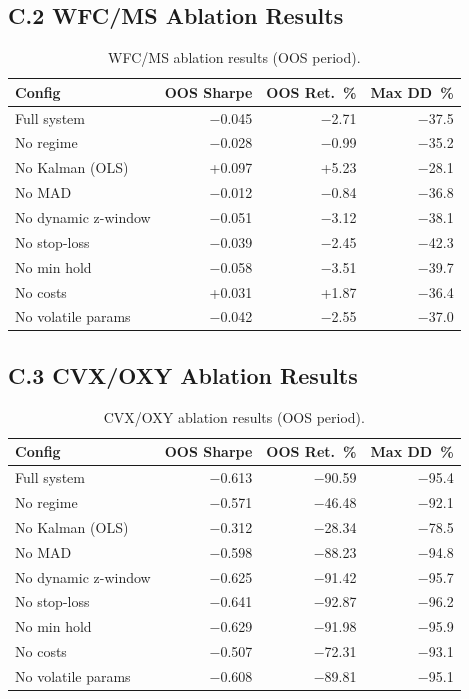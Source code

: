 \documentclass[conference]{IEEEtran}
\begin{document}
\subsection{C.2 WFC/MS Ablation Results}

\begin{table}[h]
\centering
\caption{WFC/MS ablation results (OOS period).}
\label{tab:supp_wfc_abl}
\small
\begin{tabular}{lrrr}
\toprule
Config & OOS Sharpe & OOS Ret.~\% & Max DD~\% \\
\midrule
Full system & $-$0.045 & $-$2.71 & $-$37.5 \\
No regime & $-$0.028 & $-$0.99 & $-$35.2 \\
No Kalman (OLS) & +0.097 & +5.23 & $-$28.1 \\
No MAD & $-$0.012 & $-$0.84 & $-$36.8 \\
No dynamic z-window & $-$0.051 & $-$3.12 & $-$38.1 \\
No stop-loss & $-$0.039 & $-$2.45 & $-$42.3 \\
No min hold & $-$0.058 & $-$3.51 & $-$39.7 \\
No costs & +0.031 & +1.87 & $-$36.4 \\
No volatile params & $-$0.042 & $-$2.55 & $-$37.0 \\
\bottomrule
\end{tabular}
\end{table}

\subsection{C.3 CVX/OXY Ablation Results}

\begin{table}[h]
\centering
\caption{CVX/OXY ablation results (OOS period).}
\label{tab:supp_cvx_abl}
\small
\begin{tabular}{lrrr}
\toprule
Config & OOS Sharpe & OOS Ret.~\% & Max DD~\% \\
\midrule
Full system & $-$0.613 & $-$90.59 & $-$95.4 \\
No regime & $-$0.571 & $-$46.48 & $-$92.1 \\
No Kalman (OLS) & $-$0.312 & $-$28.34 & $-$78.5 \\
No MAD & $-$0.598 & $-$88.23 & $-$94.8 \\
No dynamic z-window & $-$0.625 & $-$91.42 & $-$95.7 \\
No stop-loss & $-$0.641 & $-$92.87 & $-$96.2 \\
No min hold & $-$0.629 & $-$91.98 & $-$95.9 \\
No costs & $-$0.507 & $-$72.31 & $-$93.1 \\
No volatile params & $-$0.608 & $-$89.81 & $-$95.1 \\
\bottomrule
\end{tabular}
\end{table}
\end{document}
